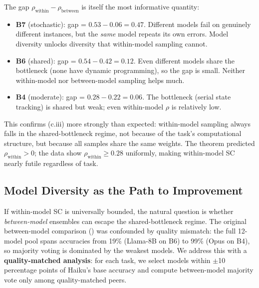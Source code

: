 \documentclass{article}
\theoremstyle{definition}
\theoremstyle{remark}
\begin{document}
The gap $\rho_{\text{within}} - \rho_{\text{between}}$ is itself the most informative quantity:
\begin{itemize}[leftmargin=*,itemsep=1pt]
    \item \textbf{B7} (stochastic): gap = $0.53 - 0.06 = 0.47$. Different models fail on genuinely different instances, but the \emph{same} model repeats its own errors. Model diversity unlocks diversity that within-model sampling cannot.
    \item \textbf{B6} (shared): gap = $0.54 - 0.42 = 0.12$. Even different models share the bottleneck (none have dynamic programming), so the gap is small. Neither within-model nor between-model sampling helps much.
    \item \textbf{B4} (moderate): gap = $0.28 - 0.22 = 0.06$. The bottleneck (serial state tracking) is shared but weak; even within-model $\rho$ is relatively low.
\end{itemize}

This confirms (c.iii) more strongly than expected: within-model sampling always falls in the shared-bottleneck regime, not because of the task's computational structure, but because all samples share the same weights.
The theorem predicted $\rho_{\text{within}} > 0$; the data show $\rho_{\text{within}} \geq 0.28$ uniformly, making within-model SC nearly futile regardless of task.

\subsection{Model Diversity as the Path to Improvement}
\label{sec:exp_ensemble}

If within-model SC is universally bounded, the natural question is whether \emph{between-model} ensembles can escape the shared-bottleneck regime.
The original between-model comparison () was confounded by quality mismatch: the full 12-model pool spans accuracies from 19\% (Llama-8B on B6) to 99\% (Opus on B4), so majority voting is dominated by the weakest models.
We address this with a \textbf{quality-matched analysis}: for each task, we select models within $\pm$10 percentage points of Haiku's base accuracy and compute between-model majority vote only among quality-matched peers.
\end{document}
